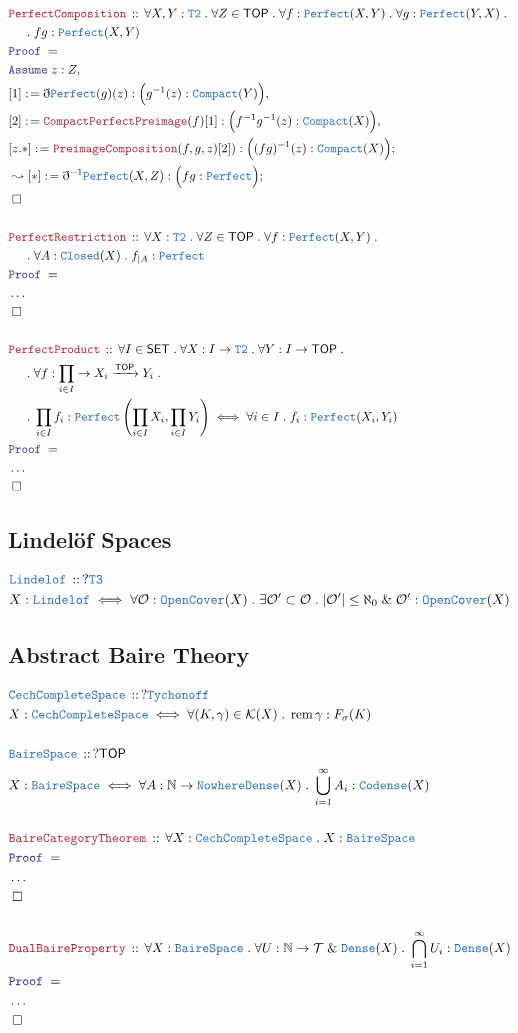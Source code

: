 \documentclass[12pt]{scrartcl}
\newcommand{\TYPE}[1]{\textcolor{NavyBlue}{\mathtt{#1}}}
\newcommand{\LOGIC}[1]{\textcolor{Blue}{\mathtt{#1}}}
\newcommand{\THM}[1]{\textcolor{Maroon}{\mathtt{#1}}}
\renewcommand{\.}{\; . \;}
\newcommand{\de}{: \kern 0.1pc =}
\newcommand{\Theorem}[2]{& \THM{#1} \, :: \, #2 \\ & \Proof = \\ }
\newcommand{\DeclareType}[2]{& \TYPE{#1} \, :: \, #2 \\}
\newcommand{\DefineType}[3]{& #1 : \TYPE{#2} \iff #3 \\}
\newcommand{\NewLine}{\\ & \kern 1pc}
\newcommand{\Page}[1]{ \begin{align*} #1 \end{align*}   }
\newcommand{ \bd }{ \ByDef }
\newcommand{\NoProof}{ & \ldots \\ \EndProof}
\renewcommand{\And}{\; \& \;}
\newcommand{\Nat}{\mathbb{N} }
\newcommand{\Arrow}{\xrightarrow}
\newcommand{\Say}[3]{& #1 \de #2 : #3, \\}
\newcommand{\Conclude}[3]{& #1 \de #2 : #3; \\}
\newcommand{\DeriveConclude}[3]{& \leadsto #1 \de #2 : #3 ; \\}
\newcommand{\Assume}[2]{& \LOGIC{Assume} \; #1 : #2, \\}
\newcommand{\QED}{\; \square}
\newcommand{\EndProof}{& \QED \\}
\newcommand{\ByDef}{\eth}
\newcommand{\Proof}{\LOGIC{Proof} \; }
\newcommand{\SET}{\mathsf{SET}}
\DeclareMathOperator{\rem}{rem}
\newcommand{\TOP}{\mathsf{TOP}}
\newcommand{\T}{\mathcal{T}}
\begin{document}
\Page{
	\Theorem{PerfectComposition}
	{
		\forall X,Y : \TYPE{T2} \.
		\forall Z \in \TOP \.
		\forall f : \TYPE{Perfect}(X,Y) \.
		\forall g : \TYPE{Perfect}(Y,X) \. \NewLine \.
		fg : \TYPE{Perfect}(X,Y) 
	}
	\Assume{z}{Z}
	\Say{[1]}{\bd \TYPE{Perfect}(g)(z)}{\Big( g^{-1}(z) : \TYPE{Compact}(Y) \Big)}
	\Say{[2]}{\THM{CompactPerfectPreimage}(f)[1]}{\Big( f^{-1}g^{-1}(z) : \TYPE{Compact}(X) \Big)}
	\Conclude{[z.*]}{\THM{PreimageComposition}(f,g,z)[2])}{\Big( (fg)^{-1}(z) : \TYPE{Compact}(X) \Big)}
	\DeriveConclude{[*]}{\bd^{-1}\TYPE{Perfect}(X,Z)}{\Big( fg : \TYPE{Perfect} \Big)}
	\EndProof
	\\
	\Theorem{PerfectRestriction}
	{
		\forall X : \TYPE{T2} \.
		\forall Z \in \TOP \.
		\forall f : \TYPE{Perfect}(X,Y) \. \NewLine \.
		\forall A : \TYPE{Closed}(X)   \.
		f_{|A} : \TYPE{Perfect}                           
	}
	\NoProof
	\\
	\Theorem{PerfectProduct}
	{
		\forall I \in \SET \.
		\forall X : I \to\TYPE{T2} \.
		\forall Y : I \to \TOP \. \NewLine \.
		\forall f : \prod_{i \in I} \to X_i \Arrow{\TOP} Y_i \. \NewLine \. 
		\prod_{i \in I} f_i : \TYPE{Perfect}\left(\prod_{i \in I} X_i, \prod_{i \in I} Y_i\right) 
		\iff
		\forall i \in I \. f_i : \TYPE{Perfect}(X_i,Y_i)
	}
	\NoProof
}
\newpage
\subsection{Lindel\"of Spaces}
\Page{   
	\DeclareType{Lindelof}
	{
		?\TYPE{T3}
	}
	\DefineType{X}{Lindelof}
	{
		\forall \mathcal{O} : \TYPE{OpenCover}(X) \. 
		\exists \mathcal{O}' \subset \mathcal{O} \.
		|\mathcal{O}'| \le \aleph_0 \And \mathcal{O}' : \TYPE{OpenCover}(X)
	}
}
\newpage
\subsection{Abstract Baire Theory}
\Page{
	\DeclareType{CechCompleteSpace}{?\TYPE{Tychonoff}}
	\DefineType{X}{CechCompleteSpace}{\forall (K,\gamma) \in \mathcal{K}(X) \. \rem \gamma : F_\sigma(K)}
	\\
	\DeclareType{BaireSpace}{?\TOP}
	\DefineType{X}{BaireSpace}{\forall A : \Nat \to \TYPE{NowhereDense}(X) \. \bigcup^\infty_{i=1} A_i : \TYPE{Codense}(X)}
	\\
	\Theorem{BaireCategoryTheorem}{\forall X : \TYPE{CechCompleteSpace} \. X : \TYPE{BaireSpace}  }
	\NoProof
	\\
	\Theorem{DualBaireProperty}{\forall X : \TYPE{BaireSpace} \. \forall U : \Nat \to \T \And \TYPE{Dense}(X) \. \bigcap^\infty_{i=1} U_i : \TYPE{Dense}(X)}
	\NoProof
}
\newpage
\end{document}
